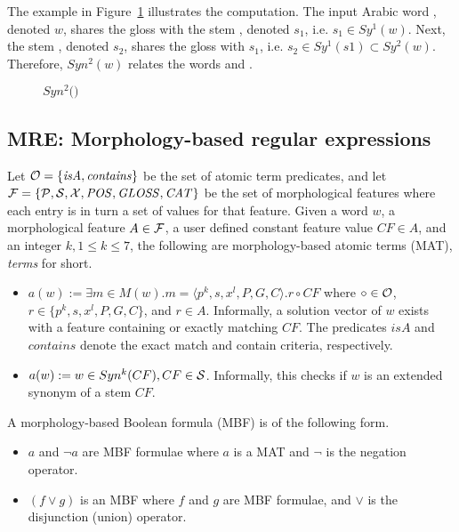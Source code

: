 The example in Figure~\ref{fig:introsynEx} illustrates the computation.
The input Arabic word , denoted $w$, shares the gloss  with the stem , denoted $s_1$, i.e. $s_1\in Sy^{1}(w)$.
Next, the stem , denoted $s_2$, shares the gloss  with $s_1$, i.e. $s_2\in Sy^{1}(s1)\subset Sy^{2}(w)$.
Therefore, $Syn^2(w)$ relates the words  and .

\begin{figure}[tb!]
\begin{center}
\caption{$Syn^2($$)$}
\label{fig:introsynEx}
\end{center}
\end{figure}

\subsection{MRE: Morphology-based regular expressions}

Let ${\cal O} = \{ \mathit{isA}, \mathit{contains}\}$ be the set of atomic term 
predicates, and let ${\cal F} = \{ \pp, \ss, \xx, \PP, \GG, \AC\}$ be the 
set of morphological features where each entry is in turn a set of values for that feature.
Given a word $w$, a morphological feature $A\in{\cal F}$, 
a user defined constant feature value $CF\in A$, and an integer 
$k, 1\le k\le 7$, 
the following are morphology-based atomic terms (MAT), {\em terms} for short.
\begin{itemize}
  \item $a(w):= \exists m \in M(w). m=\langle p^k,s,x^l,P,G,C\rangle. r \circ CF$
where $\circ \in {\cal O}$, $r \in \{p^k,s,x^l,P,G,C\}$, and $r\in A$.
Informally, a solution vector of $w$ exists with
a feature containing or exactly matching $CF$.
The predicates $\mathit{isA}$ and $\mathit{contains}$ denote the exact match and contain criteria, respectively.
\item $a(w) := w \in Syn^k(CF), CF \in \ss$.
  Informally, this checks if $w$ is an extended synonym of a stem $CF$. 
\end{itemize}

A morphology-based Boolean formula (MBF) is of the following form.
\begin{itemize}
  \item $a$ and $\neg a$ are MBF formulae where $a$ is a MAT and $\neg$ is the negation operator. 
  \item $(f \vee g)$ is an MBF where $f$ and $g$ are MBF formulae, 
    and $\vee$ is the disjunction (union) operator. 
\end{itemize}

